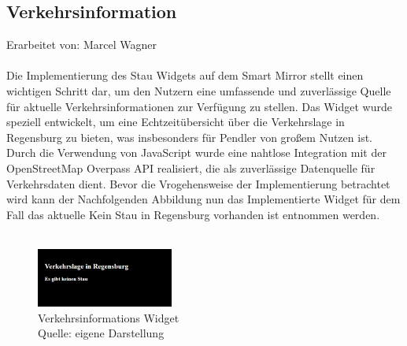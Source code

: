 \subsection{Verkehrsinformation}
Erarbeitet von: Marcel Wagner \\ \\
\noindent
Die Implementierung des Stau Widgets auf dem Smart Mirror stellt einen wichtigen Schritt dar, um den Nutzern eine umfassende und zuverlässige Quelle für aktuelle Verkehrsinformationen zur Verfügung zu stellen. Das Widget wurde speziell entwickelt, um eine Echtzeitübersicht über die Verkehrslage in Regensburg zu bieten, was insbesonders für Pendler von großem Nutzen ist. Durch die Verwendung von JavaScript wurde eine nahtlose Integration mit der OpenStreetMap Overpass API realisiert, die als zuverlässige Datenquelle für Verkehrsdaten dient. Bevor die Vrogehensweise der Implementierung betrachtet wird kann der Nachfolgenden Abbildung nun das Implementierte Widget  für dem Fall das aktuelle Kein Stau in Regensburg vorhanden ist entnommen werden. \\ \\
\noindent
\begin{figure}[h]
    \centering
    \includegraphics[width=0.4\textwidth]{pictures/traffic_widget.png}
  \captionsetup{justification=centering, labelformat=simple, singlelinecheck=false}
    \caption[Verkehrsinformations Widget]{Verkehrsinformations Widget\\ Quelle: eigene Darstellung}
\end{figure}

